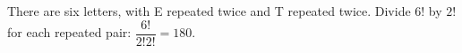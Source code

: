 There are six letters, with E repeated twice and T repeated twice. Divide $6!$ by $2!$ for each repeated pair: $\dfrac{6!}{2!2!}=\boxed{180}$.
